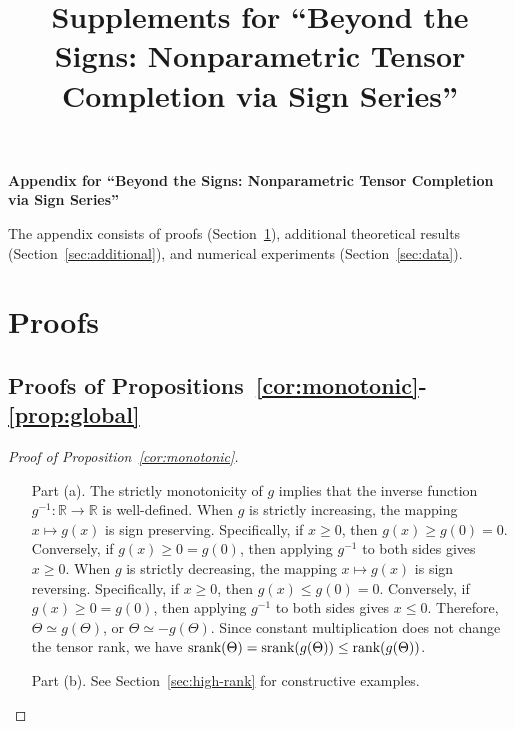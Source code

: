 \documentclass[11pt]{article}
\title{Supplements for ``Beyond the Signs: Nonparametric Tensor Completion via Sign Series''}
\theoremstyle{plain}
\theoremstyle{definition}
\def\srank{\textup{srank}}
\def\rank{\textup{rank}}
\begin{document}
\begin{center}
\begin{spacing}{1.5}
\textbf{\Large Appendix for ``Beyond the Signs: Nonparametric Tensor Completion via Sign Series''}
\end{spacing}
\end{center}

\appendix
The appendix consists of  proofs (Section~\ref{sec:proofs}), additional theoretical results (Section~\ref{sec:additional}),  and numerical experiments (Section~\ref{sec:data}).

\section{Proofs}\label{sec:proofs}
\subsection{Proofs of Propositions~\ref{cor:monotonic}-\ref{prop:global}}
\begin{proof}[Proof of Proposition~\ref{cor:monotonic}] \hfill
\begin{enumerate}[label={2.\arabic*},wide, labelindent=0pt]
\item[Part (a).] The strictly monotonicity of $g$ implies that the inverse function $g^{-1}\colon \mathbb{R}\to \mathbb{R}$ is well-defined. 
When $g$ is strictly increasing, the mapping $x\mapsto g(x)$ is sign preserving. Specifically, if $x\geq 0$, then $g(x)\geq g(0)=0$. Conversely, if $g(x)\geq 0=g(0)$, then applying $g^{-1}$ to both sides gives $x\geq 0$.
When $g$ is strictly decreasing, the mapping $x\mapsto g(x)$ is sign reversing. Specifically, if $x\geq 0$, then $g(x)\leq g(0)=0$. Conversely, if $g(x)\geq 0=g(0)$, then applying $g^{-1}$ to both sides gives $x\leq 0$.
 Therefore, $\Theta\simeq g(\Theta)$,  or $\Theta\simeq -g(\Theta)$. Since constant multiplication  does not change the tensor rank,  we have $\srank(\Theta)=\srank(g(\Theta))\leq \rank (g(\Theta))$. 
\item[Part (b).] See Section~\ref{sec:high-rank} for constructive examples.
\end{enumerate}
\end{proof}
\end{document}
